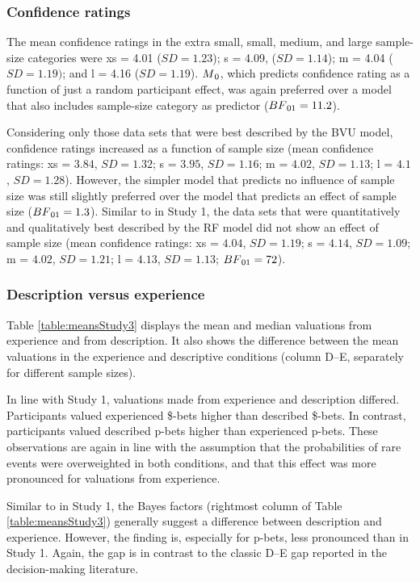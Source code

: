\documentclass[a4paper,man, natbib]{apa6} %
\begin{document}
\subsubsection{Confidence ratings}
The mean confidence ratings in the extra small, small, medium, and large sample-size categories were xs = 4.01 ($SD = 1.23$); s = 4.09, ($SD = 1.14$); m = 4.04 ($SD = 1.19)$; and l = 4.16 ($SD = 1.19$). $M\textsubscript{0}$, which predicts confidence rating as a function of just a random participant effect, was again preferred over a model that also includes sample-size category as predictor ($BF\textsubscript{01} = 11.2$). 

Considering only those data sets that were best described by the BVU model, confidence ratings increased as a function of  sample size (mean confidence ratings: xs = $3.84$, $SD = 1.32$; s = $3.95$, $SD = 1.16$; m = $4.02$, $SD = 1.13$; l = $4.1$, $SD = 1.28$). However, the simpler model that predicts no influence of sample size was still slightly preferred over the model that predicts an effect of sample size ($BF\textsubscript{01} = 1.3$). Similar to in Study 1, the data sets that were quantitatively and qualitatively best described by the RF model did not show an effect of sample size (mean confidence ratings: xs = $4.04$, $SD = 1.19$; s = $4.14$, $SD = 1.09$; m = $4.02$, $SD = 1.21$; l = $4.13$, $SD = 1.13$; $BF\textsubscript{01} = 72$).
\subsubsection{Description versus experience}

Table \ref{table:meansStudy3} displays the mean and median valuations from experience and from description. It also shows the difference between the mean valuations in the experience and descriptive conditions (column D--E, separately for different sample sizes). 

In line with Study 1, valuations made from experience and description differed. Participants valued experienced \$-bets higher than described \$-bets. In contrast, participants valued described p-bets higher than experienced p-bets. These observations are again in line with the assumption that the probabilities of rare events were overweighted in both conditions, and that this effect was more pronounced for valuations from experience.

Similar to in Study 1, the Bayes factors (rightmost column of Table \ref{table:meansStudy3}) generally suggest a difference between description and experience. However, the finding is, especially for p-bets, less pronounced than in Study 1. Again, the gap is in contrast to the classic D--E gap reported in the decision-making literature.
\end{document}
